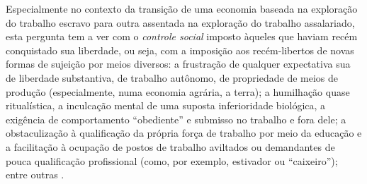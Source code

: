 Especialmente no contexto da transição de uma economia baseada na exploração do trabalho escravo para outra assentada na exploração do trabalho assalariado, esta pergunta tem a ver com o \textit{controle social} imposto àqueles que haviam recém conquistado sua liberdade, ou seja, com a imposição aos recém-libertos de novas formas de sujeição por meios diversos: a frustração de qualquer expectativa sua de liberdade substantiva, de trabalho autônomo, de propriedade de meios de produção (especialmente, numa economia agrária, a terra); a humilhação quase ritualística, a inculcação mental de uma suposta inferioridade biológica, a exigência de comportamento ``obediente'' e submisso no trabalho e fora dele; a obstaculização à qualificação da própria força de trabalho por meio da educação e a facilitação à ocupação de postos de trabalho aviltados ou demandantes de pouca qualificação profissional (como, por exemplo, estivador ou ``caixeiro''); entre outras \cite{bacelar_negrosalvador_1994, chalhoub_botequim_1986}.

